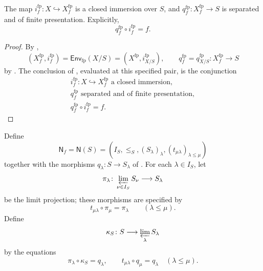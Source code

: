 \begin{lemma}
\checked
  \label{lemma:nagata-final-fp-envelope}
  \lean{}

  The map $i_f^{\mathrm{fp}}\colon X\hookrightarrow X_f^{\mathrm{fp}}$ is a
  closed immersion over $S$, and
  $q_f^{\mathrm{fp}}\colon X_f^{\mathrm{fp}}\to S$ is separated and of
  finite presentation.  Explicitly,
  \[
    q_f^{\mathrm{fp}}\circ i_f^{\mathrm{fp}}=f.
  \]
\end{lemma}

\begin{proof}
  By ,
  \[
    (X_f^{\mathrm{fp}},i_f^{\mathrm{fp}})
      =\mathsf{Env}_{\mathrm{fp}}(X/S)
      =(X^{\mathrm{fp}},i^{\mathrm{fp}}_{X/S}),
    \qquad
    q_f^{\mathrm{fp}}=q^{\mathrm{fp}}_{X/S}
      \colon X_f^{\mathrm{fp}}\to S
  \]
  by .  The conclusion of
  , evaluated at this specified
  pair, is the conjunction
  \[
  \begin{gathered}
    i_f^{\mathrm{fp}}\colon X\hookrightarrow X_f^{\mathrm{fp}}
      \text{ a closed immersion},\\
    q_f^{\mathrm{fp}}\text{ separated and of finite presentation},\\
    q_f^{\mathrm{fp}}\circ i_f^{\mathrm{fp}}=f.
  \end{gathered}
  \]
\end{proof}

\begin{definition}
  \label{def:nagata-final-noetherian-base-system}
  \checked\lean{}

  Define
  \[
    \mathsf N_f=\mathsf N(S)
      =(I_S,\leq_S,(S_\lambda)_\lambda,
        (t_{\mu\lambda})_{\lambda\leq\mu})
  \]
  together with the morphisms $q_\lambda\colon S\to S_\lambda$ of
  .  For each $\lambda\in I_S$, let
  \[
    \pi_\lambda\colon\varprojlim_{\nu\in I_S}S_\nu\longrightarrow S_\lambda
  \]
  be the limit projection; these morphisms are specified by
  \[
    t_{\mu\lambda}\circ\pi_\mu=\pi_\lambda
      \qquad(\lambda\leq\mu).
  \]
  Define
  \[
    \kappa_S\colon S\longrightarrow\varprojlim_\lambda S_\lambda
  \]
  by the equations
  \[
    \pi_\lambda\circ\kappa_S=q_\lambda,
    \qquad
    t_{\mu\lambda}\circ q_\mu=q_\lambda
      \quad(\lambda\leq\mu).
  \]
\end{definition}

